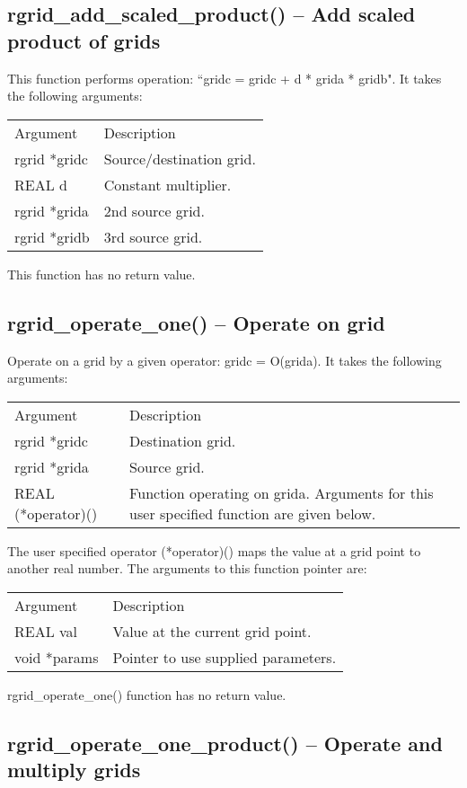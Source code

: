 \documentclass[12pt,letterpaper]{report}
\begin{document}
\subsection{rgrid\_add\_scaled\_product() -- Add scaled product of grids}

This function performs operation: ``gridc = gridc + d * grida * gridb". It takes the following arguments:
\begin{longtable}{p{} p{}}
Argument & Description\\
\cline{1-2}
rgrid *gridc & Source/destination grid.\\
REAL d & Constant multiplier.\\
rgrid *grida & 2nd source grid.\\
rgrid *gridb & 3rd source grid.\\      
\end{longtable}
\noindent
This function has no return value.

\subsection{rgrid\_operate\_one() -- Operate on grid}

Operate on a grid by a given operator: gridc = O(grida). It takes the following arguments:
\begin{longtable}{p{} p{}}
Argument & Description\\
\cline{1-2}
rgrid *gridc & Destination grid.\\
rgrid *grida & Source grid.\\
REAL (*operator)() & Function operating on grida. Arguments for this user specified function are given below.\\
\end{longtable}
\noindent
The user specified operator (*operator)() maps the value at a grid point to another real number. The arguments to this function pointer are:
\begin{longtable}{p{} p{}}
Argument & Description\\
\cline{1-2}
REAL val & Value at the current grid point.\\
void *params & Pointer to use supplied parameters.\\
\end{longtable}
\noindent
rgrid\_operate\_one() function has no return value.

\subsection{rgrid\_operate\_one\_product() -- Operate and multiply grids}
\end{document}

